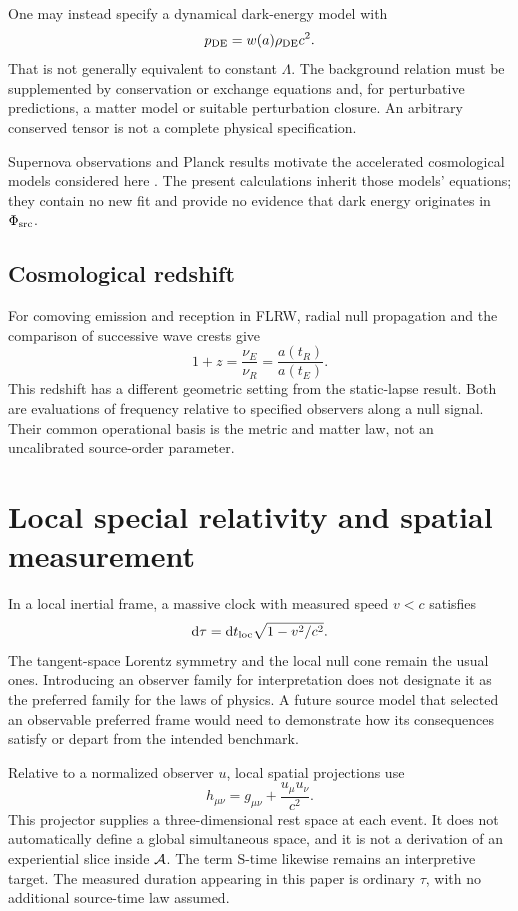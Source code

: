 \documentclass[11pt]{article}
\begin{document}
One may instead specify a dynamical dark-energy model with
\begin{equation}
p_{\rm DE}=w(a)\rho_{\rm DE}c^2.
\label{eq:wa}
\end{equation}
That is not generally equivalent to constant $\Lambda$. The background relation must be supplemented by conservation or exchange equations and, for perturbative predictions, a matter model or suitable perturbation closure. An arbitrary conserved tensor is not a complete physical specification.

Supernova observations and Planck results motivate the accelerated cosmological models considered here \parencite{Riess1998,Perlmutter1999,Planck2018Parameters}. The present calculations inherit those models' equations; they contain no new fit and provide no evidence that dark energy originates in $\Phi_{\mathrm{src}}$.

\subsection{Cosmological redshift}
For comoving emission and reception in FLRW, radial null propagation and the comparison of successive wave crests give
\begin{equation}
1+z=\frac{\nu_E}{\nu_R}=\frac{a(t_R)}{a(t_E)}.
\end{equation}
This redshift has a different geometric setting from the static-lapse result. Both are evaluations of frequency relative to specified observers along a null signal. Their common operational basis is the metric and matter law, not an uncalibrated source-order parameter.

\section{Local special relativity and spatial measurement}
In a local inertial frame, a massive clock with measured speed $v<c$ satisfies
\begin{equation}
\mathrm d\tau=\mathrm d t_{\rm loc}\sqrt{1-v^2/c^2}.
\label{eq:kinematictimedilation}
\end{equation}
The tangent-space Lorentz symmetry and the local null cone remain the usual ones. Introducing an observer family for interpretation does not designate it as the preferred family for the laws of physics. A future source model that selected an observable preferred frame would need to demonstrate how its consequences satisfy or depart from the intended benchmark.

Relative to a normalized observer $u$, local spatial projections use
\begin{equation}
h_{\mu\nu}=g_{\mu\nu}+\frac{u_\mu u_\nu}{c^2}.
\label{eq:spatialprojector}
\end{equation}
This projector supplies a three-dimensional rest space at each event. It does not automatically define a global simultaneous space, and it is not a derivation of an experiential slice inside $\mathcal A$. The term S-time likewise remains an interpretive target. The measured duration appearing in this paper is ordinary $\tau$, with no additional source-time law assumed.
\end{document}
